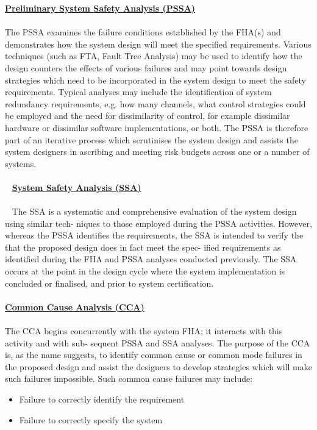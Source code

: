 \documentclass[9pt, landscape, fleqn]{scrartcl}
\begin{document}
\begin{multicols*}{3}
\underline{\textbf{Preliminary System Safety Analysis (PSSA)}} \\ \\ 
The PSSA examines the failure conditions established by the FHA(s) and demonstrates how the system design will meet the specified requirements. Various techniques (such as FTA, Fault Tree Analysis) may be used to identify how the design counters the effects of various failures and may point towards design strategies which need to be incorporated in the system design to meet the safety requirements. Typical analyses may include the identification of system redundancy requirements, e.g. how many channels, what control strategies could be employed and the need for dissimilarity of control, for example dissimilar hardware or dissimilar software implementations, or both. The PSSA is therefore part of an iterative process which scrutinises the system design and assists the system designers in ascribing and meeting risk budgets across one or a number of systems. \\ \\ 
\underline{\textbf{System Safety Analysis (SSA)}} \\ \\ 
The SSA is a systematic and comprehensive evaluation of the system design using similar tech- niques to those employed during the PSSA activities. However, whereas the PSSA identifies the requirements, the SSA is intended to verify the that the proposed design does in fact meet the spec- ified requirements as identified during the FHA and PSSA analyses conducted previously. The SSA occurs at the point in the design cycle where the system implementation is concluded or finalised, and prior to system certification. \\ \\ 
\underline{\textbf{Common Cause Analysis (CCA)}} \\ \\ 
The CCA begins concurrently with the system FHA; it interacts with this activity and with sub- sequent PSSA and SSA analyses. The purpose of the CCA is, as the name suggests, to identify common cause or common mode failures in the proposed design and assist the designers to develop strategies which will make such failures impossible. Such common cause failures may include:
\begin{itemize}
    \item Failure to correctly identify the requirement
    \item Failure to correctly specify the system

\end{itemize}
\end{multicols*}
\end{document}
